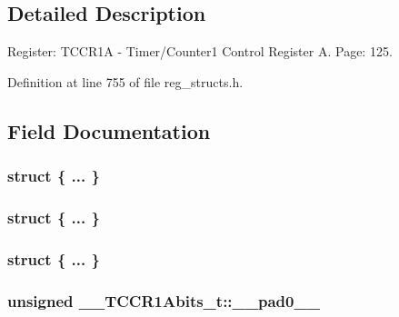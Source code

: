 \subsection{Detailed Description}
Register\+: T\+C\+C\+R1\+A -\/ Timer/\+Counter1 Control Register A. Page\+: 125. 

Definition at line 755 of file reg\+\_\+structs.\+h.



\subsection{Field Documentation}
\hypertarget{union_____t_c_c_r1_abits__t_a4198f2decd2e63d5e57a1f2f6f73a998}{\subsubsection[{"@183}]{\setlength{\rightskip}{0pt plus 5cm}struct \{ ... \} }}\label{union_____t_c_c_r1_abits__t_a4198f2decd2e63d5e57a1f2f6f73a998}
\hypertarget{union_____t_c_c_r1_abits__t_a5de0902fffdc9fa6045bc9b58f26afc9}{\subsubsection[{"@185}]{\setlength{\rightskip}{0pt plus 5cm}struct \{ ... \} }}\label{union_____t_c_c_r1_abits__t_a5de0902fffdc9fa6045bc9b58f26afc9}
\hypertarget{union_____t_c_c_r1_abits__t_a8eca7e79ec358ba39dfa43ba88391d6a}{\subsubsection[{"@187}]{\setlength{\rightskip}{0pt plus 5cm}struct \{ ... \} }}\label{union_____t_c_c_r1_abits__t_a8eca7e79ec358ba39dfa43ba88391d6a}
\hypertarget{union_____t_c_c_r1_abits__t_aa18fc8dbd0f9d5c422019b76eab4b875}{
\subsubsection[{\+\_\+\+\_\+pad0\+\_\+\+\_\+}]{\setlength{\rightskip}{0pt plus 5cm}unsigned \+\_\+\+\_\+\+T\+C\+C\+R1\+Abits\+\_\+t\+::\+\_\+\+\_\+pad0\+\_\+\+\_\+}}\label{union_____t_c_c_r1_abits__t_aa18fc8dbd0f9d5c422019b76eab4b875}


